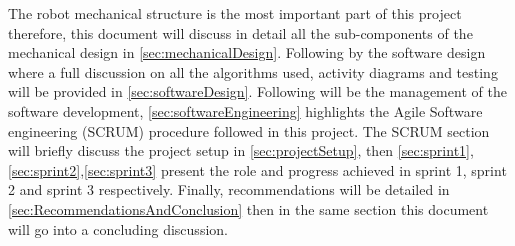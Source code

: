 \noindent The robot mechanical structure is the most important part of this project therefore, this document will discuss in detail all the sub-components of the mechanical design in \vref{sec:mechanicalDesign}. Following by the software design where a full discussion on all the algorithms used, activity diagrams and testing will be provided in \vref{sec:softwareDesign}. Following will be the management of the software development, \vref{sec:softwareEngineering} highlights the Agile Software engineering (SCRUM) procedure followed in this project. The SCRUM section will briefly discuss the project setup in \vref{sec:projectSetup}, then \cref{sec:sprint1}, \cref{sec:sprint2},\cref{sec:sprint3} present the role and progress achieved in sprint 1, sprint 2 and sprint 3 respectively. Finally, recommendations will be detailed in \vref{sec:RecommendationsAndConclusion} then in the same section this document will go into a concluding discussion.









